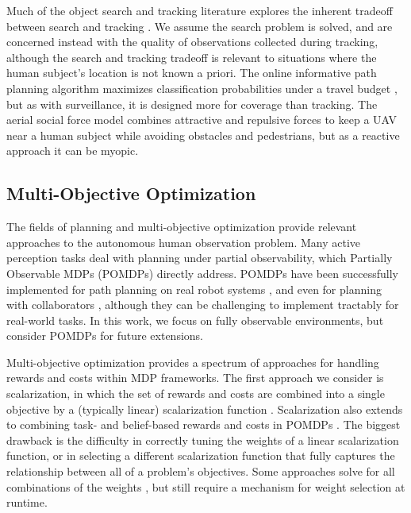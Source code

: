 \documentclass[letterpaper, 10 pt, conference]{ieeeconf}  %
\begin{document}
Much of the object search and tracking literature explores the inherent tradeoff between search and tracking \cite{wang2008awareness, sung2017algorithm}.  We assume the search problem is solved, and are concerned instead with the quality of observations collected during tracking, although the search and tracking tradeoff is relevant to situations where the human subject's location is not known a priori.  The online informative path planning algorithm maximizes classification probabilities under a travel budget \cite{popovic2017online}, but as with surveillance, it is designed more for coverage than tracking.  The aerial social force model \cite{garrell2017aerial} combines attractive and repulsive forces to keep a UAV near a human subject while avoiding obstacles and pedestrians, but as a reactive approach it can be myopic.

\subsection{Multi-Objective Optimization}
The fields of planning and multi-objective optimization provide relevant approaches to the autonomous human observation problem.  Many active perception tasks deal with planning under partial observability, which Partially Observable MDPs (POMDPs) directly address.  POMDPs have been successfully implemented for path planning on real robot systems \cite{ragi2013uav}, and even for planning with collaborators \cite{chen2016pomdp}, although they can be challenging to implement tractably for real-world tasks.  In this work, we focus on fully observable environments, but consider POMDPs for future extensions.

Multi-objective optimization provides a spectrum of approaches for handling rewards and costs within MDP frameworks.  The first approach we consider is scalarization, in which the set of rewards and costs are combined into a single objective by a (typically linear) scalarization function \cite{roijers2013survey}.  Scalarization also extends to combining task- and belief-based rewards and costs in POMDPs \cite{eck2012evaluating}.  The biggest drawback is the difficulty in correctly tuning the weights of a linear scalarization function, or in selecting a different scalarization function that fully captures the relationship between all of a problem's objectives.  Some approaches solve for all combinations of the weights \cite{lizotte2012linear}, but still require a mechanism for weight selection at runtime.
\end{document}
